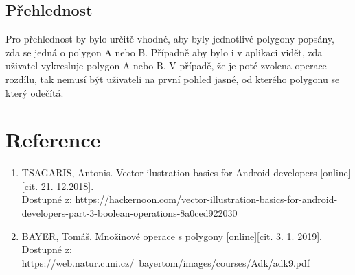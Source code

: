 \documentclass[a4paper, 12pt]{article}
\begin{document}
\subsection{Přehlednost}
Pro přehlednost by bylo určitě vhodné, aby byly jednotlivé polygony popsány, zda se jedná o polygon A nebo B. Případně aby bylo i v aplikaci vidět, zda uživatel vykresluje polygon A nebo B. V případě, že je poté zvolena operace rozdílu, tak nemusí být uživateli na první pohled jasné, od kterého polygonu se který odečítá.



\clearpage
\section{Reference}

\begin{enumerate}
\item TSAGARIS, Antonis. Vector ilustration basics for Android developers [online][cit. 21. 12.2018]. \\
Dostupné z: https://hackernoon.com/vector-illustration-basics-for-android-developers-part-3-boolean-operations-8a0ced922030 \\

\item  BAYER, Tomáš. Množinové operace s polygony [online][cit. 3. 1. 2019]. \\
Dostupné z: https://web.natur.cuni.cz/~bayertom/images/courses/Adk/adk9.pdf  \\


\end{enumerate}
\end{document}
